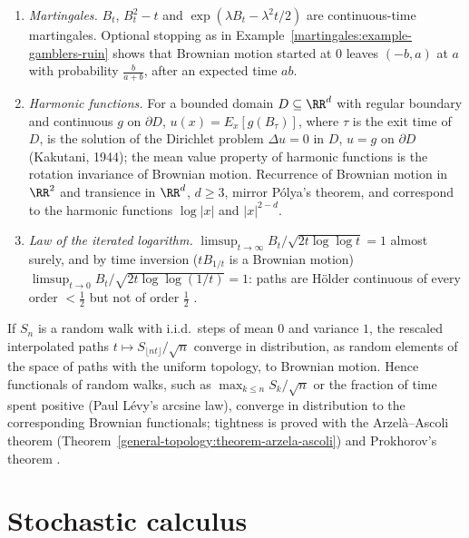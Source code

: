 \begin{remark}\label{martingales:remark-brownian}
\begin{enumerate}
\item \emph{Martingales.} $B_t$, $B_t^2 - t$ and $\exp(\lambda B_t - \lambda^2t/2)$ are continuous-time martingales. Optional stopping as in Example~\ref{martingales:example-gamblers-ruin} shows that Brownian motion started at $0$
leaves $(-b, a)$ at $a$ with probability $\frac{b}{a + b}$, after an expected time $ab$.
\item \emph{Harmonic functions.} For a bounded domain $D \subseteq \RR^d$ with regular boundary and continuous $g$ on $\partial D$, $u(x) = E_x[g(B_\tau)]$, where $\tau$ is the exit time of $D$, is the solution of the Dirichlet problem
$\Delta u = 0$ in $D$, $u = g$ on $\partial D$ (Kakutani, 1944); the mean value property of harmonic functions is the rotation invariance of Brownian motion. Recurrence of Brownian motion in $\RR^2$ and transience in $\RR^d$,
$d \geq 3$, mirror P\'olya's theorem, and correspond to the harmonic functions $\log|x|$ and $|x|^{2-d}$.
\item \emph{Law of the iterated logarithm.} $\limsup_{t \to \infty}B_t/\sqrt{2t\log\log t} = 1$ almost surely, and by time inversion ($tB_{1/t}$ is a Brownian motion) $\limsup_{t \to 0}B_t/\sqrt{2t\log\log(1/t)} = 1$: paths are H\"older
continuous of every order $<\frac12$ but not of order $\frac12$ \cite{morters-peres}.
\end{enumerate}
\end{remark}

\begin{remark}\label{martingales:remark-donsker}
If $S_n$ is a random walk with i.i.d.\ steps of mean $0$ and variance $1$, the rescaled interpolated paths $t \mapsto S_{\lfloor nt\rfloor}/\sqrt n$ converge in distribution, as random elements of the space of paths with the uniform
topology, to Brownian motion. Hence functionals of random walks, such as $\max_{k \leq n}S_k/\sqrt n$ or the fraction of time spent positive (Paul L\'evy's arcsine law), converge in distribution to the corresponding Brownian
functionals; tightness is proved with the Arzel\`a--Ascoli theorem (Theorem~\ref{general-topology:theorem-arzela-ascoli}) and Prokhorov's theorem \cite{morters-peres}.
\end{remark}

\section{Stochastic calculus}\label{martingales:section-stochastic-calculus}


